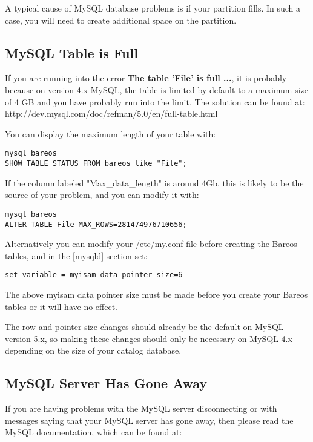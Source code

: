A typical cause of MySQL database problems is if your partition fills. In
such a case, you will need to create additional space on the partition.


\subsection{MySQL Table is Full}

If you are running into the error {\bf The table 'File' is full ...},
it is probably because on version 4.x MySQL, the table is limited by
default to a maximum size of 4 GB and you have probably run into
the limit. The solution can be found at:
{http://dev.mysql.com/doc/refman/5.0/en/full-table.html}

You can display the maximum length of your table with:

\footnotesize
\begin{verbatim}
mysql bareos
SHOW TABLE STATUS FROM bareos like "File";
\end{verbatim}
\normalsize

If the column labeled "Max\_data\_length" is around 4Gb, this is likely
to be the source of your problem, and you can modify it with:

\footnotesize
\begin{verbatim}
mysql bareos
ALTER TABLE File MAX_ROWS=281474976710656;
\end{verbatim}
\normalsize

Alternatively you can modify your /etc/my.conf file before creating the
Bareos tables, and in the [mysqld] section set:

\footnotesize
\begin{verbatim}
set-variable = myisam_data_pointer_size=6
\end{verbatim}
\normalsize

The above myisam data pointer size must be made before you create your
Bareos tables or it will have no effect.

The row and pointer size changes should already be the default on MySQL
version 5.x, so making these changes should only be necessary on MySQL 4.x
depending on the size of your catalog database.

\subsection{MySQL Server Has Gone Away}
If you are having problems with the MySQL server disconnecting or with
messages saying that your MySQL server has gone away, then please read
the MySQL documentation, which can be found at:

